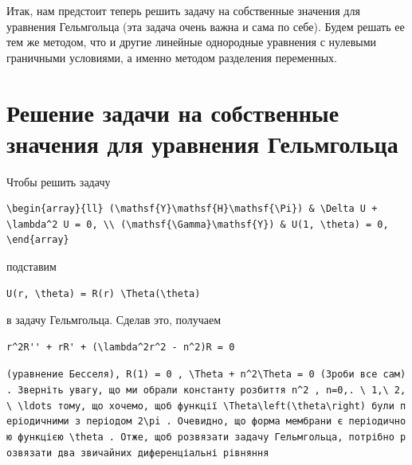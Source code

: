 \documentclass[
  ukrainian,
]{article}
\begin{document}
Итак, нам предстоит теперь решить задачу на собственные значения для
уравнения Гельмгольца (эта задача очень важна и сама по себе). Будем
решать ее тем же методом, что и другие линейные однородные уравнения с
нулевыми граничными условиями, а именно методом разделения переменных.

\section{Решение задачи на собственные значения для уравнения
Гельмгольца}\label{ux440ux435ux448ux435ux43dux438ux435-ux437ux430ux434ux430ux447ux438-ux43dux430-ux441ux43eux431ux441ux442ux432ux435ux43dux43dux44bux435-ux437ux43dux430ux447ux435ux43dux438ux44f-ux434ux43bux44f-ux443ux440ux430ux432ux43dux435ux43dux438ux44f-ux433ux435ux43bux44cux43cux433ux43eux43bux44cux446ux430}

Чтобы решить задачу

\begin{verbatim}
\begin{array}{ll} (\mathsf{Y}\mathsf{H}\mathsf{\Pi}) & \Delta U + \lambda^2 U = 0, \\ (\mathsf{\Gamma}\mathsf{Y}) & U(1, \theta) = 0, \end{array}
\end{verbatim}

подставим

\begin{verbatim}
U(r, \theta) = R(r) \Theta(\theta)
\end{verbatim}

в задачу Гельмгольца. Сделав это, получаем

\begin{verbatim}
r^2R'' + rR' + (\lambda^2r^2 - n^2)R = 0
\end{verbatim}

\texttt{(уравнение\ Бесселя),\ \textquotesingle{}R(1)\ =\ 0\textquotesingle{}\ ,\ \textquotesingle{}\textbackslash{}Theta\textquotesingle{}\textquotesingle{}\ +\ n\^{}2\textbackslash{}Theta\ =\ 0\textquotesingle{}\ (Зроби\ все\ сам).\ Зверніть\ увагу,\ що\ ми\ обрали\ константу\ розбиття\ \textquotesingle{}n\^{}2\textquotesingle{}\ ,\ \textquotesingle{}n=0,.\ \textbackslash{}\ 1,\textbackslash{}\ 2,\textbackslash{}\ \textbackslash{}ldots\textquotesingle{}\ тому,\ що\ хочемо,\ щоб\ функції\ \textquotesingle{}\textbackslash{}Theta\textbackslash{}left(\textbackslash{}theta\textbackslash{}right)\textquotesingle{}\ були\ періодичними\ з\ періодом\ \textquotesingle{}2\textbackslash{}pi\textquotesingle{}\ .\ Очевидно,\ що\ форма\ мембрани\ є\ періодичною\ функцією\ \textquotesingle{}\textbackslash{}theta\textquotesingle{}\ .\ Отже,\ щоб\ розв\textquotesingle{}язати\ задачу\ Гельмгольца,\ потрібно\ розв\textquotesingle{}язати\ два\ звичайних\ диференціальні\ рівняння}
\end{document}
